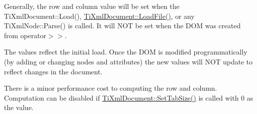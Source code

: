 Generally, the row and column value will be set when the Ti\+Xml\+Document\+::\+Load(), \hyperlink{class_ti_xml_document_a4c852a889c02cf251117fd1d9fe1845f}{Ti\+Xml\+Document\+::\+Load\+File()}, or any Ti\+Xml\+Node\+::\+Parse() is called. It will N\+O\+T be set when the D\+O\+M was created from operator$>$$>$.

The values reflect the initial load. Once the D\+O\+M is modified programmatically (by adding or changing nodes and attributes) the new values will N\+O\+T update to reflect changes in the document.

There is a minor performance cost to computing the row and column. Computation can be disabled if \hyperlink{class_ti_xml_document_a51dac56316f89b35bdb7d0d433ba988e}{Ti\+Xml\+Document\+::\+Set\+Tab\+Size()} is called with 0 as the value.

